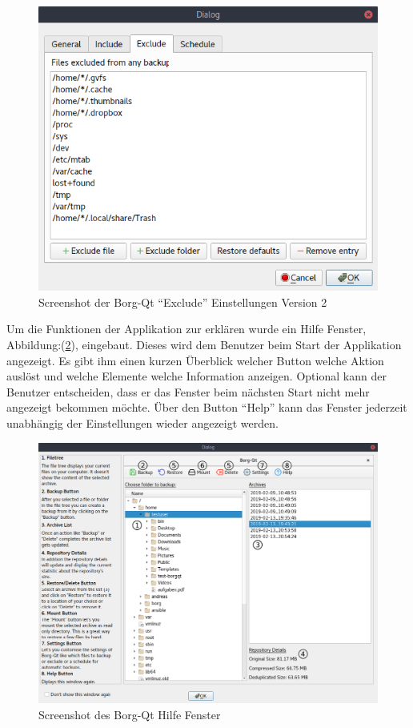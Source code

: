 \begin{figure}[H]
\centering
\includegraphics[width=.9\linewidth]{pictures/borgqt_settings_exclude_v2.png}
\caption{\label{fig:org562e65a}
Screenshot der Borg-Qt "`Exclude"' Einstellungen Version 2}
\end{figure}

Um die Funktionen der Applikation zur erklären wurde ein Hilfe Fenster,
Abbildung:(\ref{fig:orgf44d24c}), eingebaut. Dieses wird dem Benutzer beim Start der
Applikation angezeigt. Es gibt ihm einen kurzen Überblick welcher Button welche
Aktion auslöst und welche Elemente welche Information anzeigen. Optional kann
der Benutzer entscheiden, dass er das Fenster beim nächsten Start nicht mehr
angezeigt bekommen möchte. Über den Button "`Help"' kann das Fenster jederzeit
unabhängig der Einstellungen wieder angezeigt werden.

\begin{figure}[H]
\centering
\includegraphics[width=.95\linewidth]{pictures/borgqt_help.png}
\caption{\label{fig:orgf44d24c}
Screenshot des Borg-Qt Hilfe Fenster}
\end{figure}

